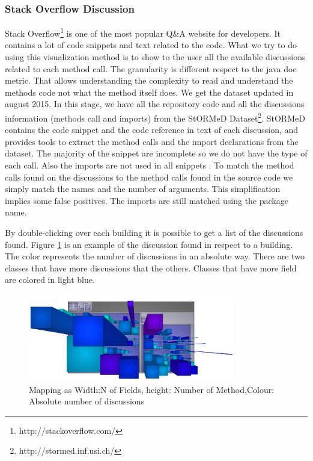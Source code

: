 \documentclass[]{usiinfbachelorproject}
\newcommand {\stormed}[0]{StORMeD\xspace}
\begin{document}
\subsubsection{Stack Overflow  Discussion}

Stack Overflow\footnote{http://stackoverflow.com/} is one of the most popular Q\&A website for developers. It contains a lot of code snippets and text related to the code. What we try to do using this visualization method is to show to the user all the available discussions related to each method call. The granularity is different respect to the java doc metric. That allows understanding the complexity to read and understand the methods code not what the method itself does. We get the dataset updated in august 2015.
In this stage, we have all the repository code and all the discussions information (methods call and imports) from the \stormed  Dataset\footnote{http://stormed.inf.usi.ch/}. 
\stormed contains  the code snippet and the code reference in text of  each discussion, and provides tools to extract the method calls and the import declarations from the dataset. The  majority of the snippet are incomplete so we do not have the type of each call. Also the imports are not used in all snippets \cite{stormed}. To match the method calls found on the discussions to the method calls found in the source code we simply match the names and the number of arguments. This simplification implies some false positives. The imports are still matched using the package name.

By double-clicking over each building it is possible to get a list of the discussions found.
Figure \ref{fig:disc} is an example of the discussion found in respect to a building. The color represents the number of discussions in an absolute way. There are two classes that have more discussions that the others. Classes that have more field are colored in light blue.


\begin{figure}[H]
	\centering
	\includegraphics[width=0.8\textwidth]{images/discAbsLang}
	
	\caption[Discussion Mapping]{Mapping as Width:N of Fields, height: Number of Method,Colour: Absolute number of discussions\label{fig:disc}}

\end{figure}
\end{document}
